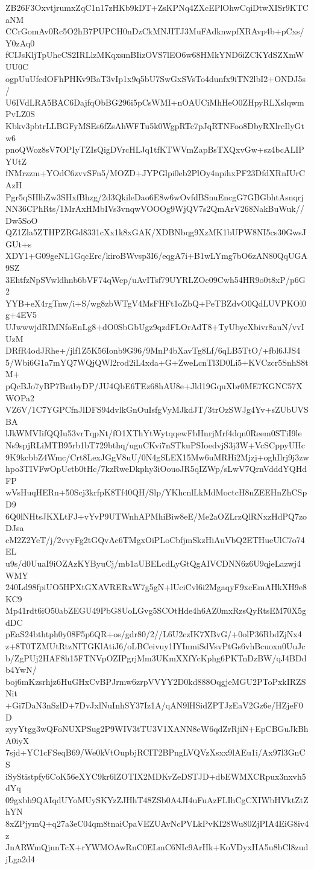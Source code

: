 ZB26F3OxvtjrumxZqC1n17zHKb9kDT+ZsKPNq4ZXcEPlOhwCqiDtwXISr9KTCaNM
CCrGomAv0Rc5O2hB7PUPCH0nDzCkMNJITJ3MuFAdknwpfXRAvp4b+pCxs/Y0zAq0
fCIJsKljTpUhcCS2IRLlzMKqxsmBIizOVS7lEO6w68HMkYND6iZCKYdSZXmWUU0C
ogpUuUfcdOFhPHKv9BaT3vIp1x9q5bU7SwGxSVsTo4dunfx9iTN2lbI2+ONDJ5s/
U6IVdLRA5BAC6DajfqObBG296i5pCsWMI+nOAUCiMhHeO0ZHpyRLXslqwmPvLZ0S
Kbkv3pbtrLLBGFyMSEs6fZsAhWFTu5k0WgpRTc7pJqRTNFoo8DbyRXlrcIlyGtw6
pnoQWoz8sV7OPIyTZIsQigDVrcHLJq1tfKTWVmZapBsTXQxvGw+sz4bcALIPYUtZ
fNMrzzm+YOdC6zvvSFn5/MOZD+JYPGlpi0eb2PlOy4npihxPF23DfdXRnIUrCAzH
Pgr5qSHlhZw3SHxfBhzg/2d3QkileDao6E8w6wOvfdBSnuEncgG7GBGbhtAsnqrj
NN36CPhRts/1MrAxHMbIVs3vnqwVOOOg9WjQV7s2QmArV268NakBuWuk//Dw5SoO
QZ1Zla5ZTHPZRGd8331cXx1k8xGAK/XDBNbqg9XzMK1bUPW8NI5cs30GwsJGUt+s
XDY1+G09geNL1GqcErc/kiroBWvsp3I6/eqgA7i+B1wLYmg7bO6zAN80QqUGA9SZ
3EhtfzNpSVwldhnb6bVF74qWep/uAvITsf79UYRLZOc09Cwh54HR9o0t8xP/p6G2
YYB+eX4rgTnw/i+S/wg8zbWTgV4MsFHFt1oZbQ+PeTBZdvO0QdLUVPKOl0g+4EV5
UJwwwjdRIMNfoEnLg8+dO0SbGbUgz9qzdFLOrAdT8+TyUbyeXbivr8auN/vvIUzM
DRfR4odJRhe+/jlf1Z5K56Ionb9G96/9MnP4bXavTg8Lf/6qLB5TtO/+fbl6JJS4
5/Wbi6G1a7mYQ7WQjQWl2rod2iL4xda+G+ZweLcnTl3D0Li5+KVCzcr5SnhS8tM+
pQcBJo7yBP7BntbyDP/JU4QbE6TEz68hAU8e+Jld19GquXbr0ME7KGNC57XWOPa2
VZ6V/1C7YGPCfnJlDFS94dvlkGnOuIsfgVyMJkdJT/3trOzSWJg4Yv+sZUbUVSBA
lJkWMVIifQQIu53vrTqpNt/fO1XThYtWytqqewFbHnrjMrf4dqn0Reem0STiI9le
Ns9spjRLiMTB95rb1bT729bthq/uguCKvi7nSTkuPSIoedvjS3j3W+VcSCppyUHc
9K9kcbbZ4Wmc/Crt8LexJGgV8uU/0N4gSLEX15Mw6uMRHi2Mjzj+oghIlrj9j3zw
hpo3TIVFwOpUctb0tHc/7kzRweDkphy3iOouoJR5qIZWp/sLwV7QrnVdddYQHdFP
wVsHuqHERn+50Scj3krfpK8Tf40QH/Slp/YKhcnlLkMdMoctcH8nZEEHnZhCSpD9
6Q0lNHtsJKXLtFJ+vYvP9UTWnhAPMhiBiw8eE/Me2aOZLrzQlRNxzHdPQ7zoDJsa
cM2Z2YeT/j/2vvyFg2tGQvAc6TMgxOiPLoCbfjmSkzHiAuVbQ2ETHueUlC7o74EL
u9s/d0UuaI9iOZAzKYByuCj/mb1aUBELcdLyGtQgAIVCDNN6z6U9qjeLazwj4WMY
240Ld98fpiUO5HPXtGXAVRERxW7g5gN+lUciCvl6i2MgaqyF9xcEmAHkXH9e8KC9
Mp41rdt6iO50abZEGU49PbG8UoLGvg5SCOtHde4h6AZ0mxRzsQyRtsEM70X5gdDC
pEaS24bthtph0y08F5p6QR+os/gdr80/2//L6U2czIK7XBvG/+0olP36RbdZjNx4
z+8T0TZMUtRtzNITGKlAtiJ6/oLBCeivuy1IYInmiSdVsvPtGs6vhBcuoxn0UuJc
b/ZgPUj2HAF8h15FTNVpOZIPgrjMm3UKmXXfYcKphg6PKTnDzBW/qJ4BDdb4YwN/
boj6mKzsrhjz6HuGHxCvBPJrmw6zrpVVYY2D0kd888OqgjeMGU2PToPxkIRZSNit
+Gi7DaN3nSzlD+7DvJxlNuInhSY37Iz1A/qAN9lHSidZPTJzEaV2Gz6e/HZjeF0D
zyyYtgg3wQFoNUXPSug2P9WIV3tTU3V1XANN8eW6qdZrRjiN+EpCBGuJkBhA0iyX
7sjd+YC1cFSeqB69/We0kVtOupbjRCIT2BPngLVQVzXsxx9lAEu1i/Ax97l3GnCS
iSyStistpfy6CoK56eXYC9kr6lZOTIX2MDKvZeDSTJD+dbEWMXCRpux3nxvh5dYq
09gxbh9QAIqdUYoMUySKYzZJHhT48ZSb0A4JI4uFuAzFLIhCgCXIWbHVktZtZhYN
8xZPjymQ+q27a3eC04qm8tnaiCpaVEZUAvNcPVLkPvKI28Wu80ZjPIA4EiG8iv4z
JnARWmQjnnTcX+rYWMOAwRnC0ELmC6NIc9ArHk+KoVDyxHA5u8bCl8zudjLga2d4
